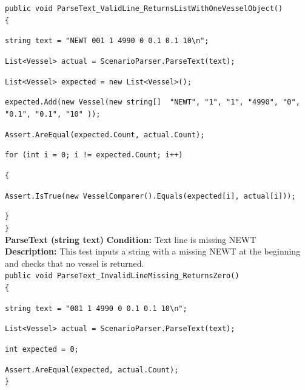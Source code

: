 \documentclass[12pt]{article}
\begin{document}
\texttt{public void ParseText\_ValidLine\_ReturnsListWithOneVesselObject()}\\
\texttt{\{}\par
\texttt{string text = "NEWT 001 1 4990 0 0.1 0.1 10\textbackslash n";}\par
\texttt{List<Vessel> actual = ScenarioParser.ParseText(text);}\par
\texttt{List<Vessel> expected = new List<Vessel>();}\par
\texttt{expected.Add(new Vessel(new string[] { "NEWT", "1", "1", "4990", "0", "0.1", "0.1", "10" }));}\par
\vspace{5 mm}
\texttt{Assert.AreEqual(expected.Count, actual.Count);}\par
\vspace{5 mm}
\texttt{for (int i = 0; i != expected.Count; i++)}\par
\texttt{\{}\par
\texttt{Assert.IsTrue(new VesselComparer().Equals(expected[i], actual[i]));}\par
\texttt{\}}\\
\texttt{\}}\\



{\bfseries ParseText (string text)} \newline
{\bfseries Condition:} Text line is missing NEWT \newline
{\bfseries Description:} This test inputs a string with a missing NEWT at the beginning and checks that no vessel is returned.\\

\texttt{public void ParseText\_InvalidLineMissing\_ReturnsZero()}\\
\texttt{\{}\par
\texttt{string text = "001         	 1   		 4990      			 0   			 0.1   		   	 	0.1 		  10\textbackslash n";}\par
\texttt{List<Vessel> actual   = ScenarioParser.ParseText(text);}\par
\texttt{int expected = 0;}\par     
\texttt{Assert.AreEqual(expected, actual.Count);}\\
\texttt{\}}\\
\end{document}
